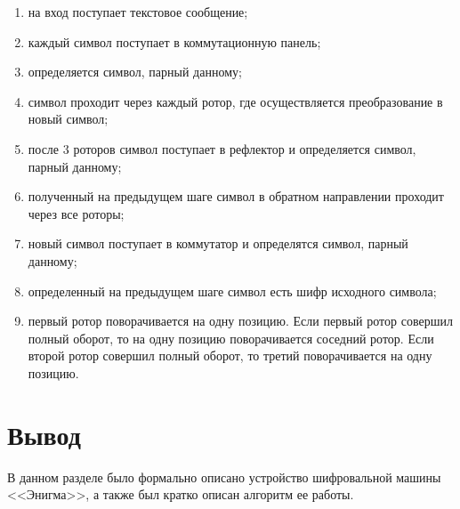 \begin{enumerate}
	\item на вход поступает текстовое сообщение;
	\item каждый символ поступает в коммутационную панель;
	\item определяется символ, парный данному;
	\item символ проходит через каждый ротор, где осуществляется преобразование в новый символ;
	\item после 3 роторов символ поступает в рефлектор и определяется символ, парный данному;
	\item полученный на предыдущем шаге символ в обратном направлении проходит через все роторы;
	\item новый символ поступает в коммутатор и определятся символ, парный данному;
	\item определенный на предыдущем шаге символ есть шифр исходного символа;
	\item первый ротор поворачивается на одну позицию. Если первый ротор совершил полный оборот, то на одну позицию поворачивается соседний ротор. Если второй ротор совершил полный оборот, то третий поворачивается на одну позицию. 
\end{enumerate}

\section*{Вывод}

В данном разделе было формально описано устройство шифровальной машины <<Энигма>>, а также был кратко описан алгоритм ее работы.
